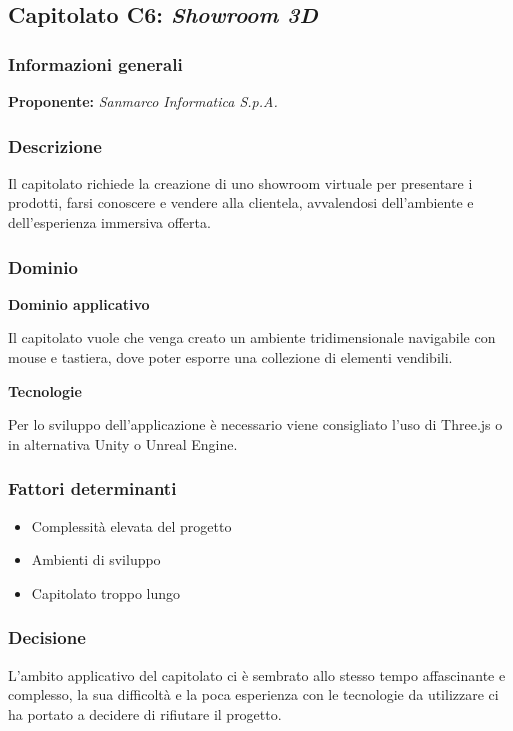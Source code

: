 \subsection{Capitolato C6: \textit{Showroom 3D}}

\subsubsection{Informazioni generali}

\textbf{Proponente:} \textit{Sanmarco Informatica S.p.A.}
\subsubsection{Descrizione}
Il capitolato richiede la creazione di uno showroom virtuale  per presentare i prodotti, farsi conoscere e vendere alla clientela, avvalendosi dell’ambiente e dell’esperienza immersiva offerta.  %

\subsubsection{Dominio}

\textbf{Dominio applicativo}

Il capitolato vuole che venga creato un ambiente tridimensionale navigabile con mouse e tastiera, dove poter esporre una collezione di elementi vendibili.

\textbf{Tecnologie}

Per lo sviluppo dell'applicazione è necessario viene consigliato l'uso di Three.js o in alternativa Unity o Unreal Engine.


\subsubsection{Fattori determinanti}
\begin{itemize}
    \item Complessità elevata del progetto
    \item Ambienti di sviluppo
    \item Capitolato troppo lungo
\end{itemize}

\subsubsection{Decisione}
L'ambito applicativo del capitolato ci è sembrato allo stesso tempo affascinante e complesso, la sua difficoltà e la poca esperienza con le tecnologie da utilizzare ci ha portato a decidere di rifiutare il progetto.
